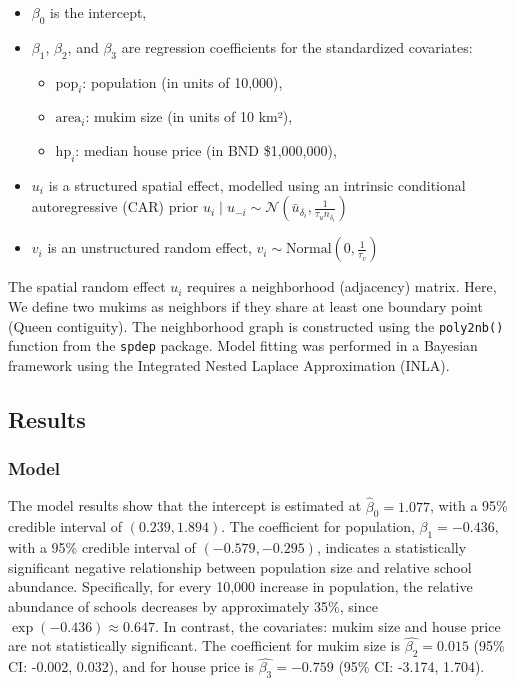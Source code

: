 \documentclass[
  12pt,
]{article}
\providecommand{\tightlist}{%
  \setlength{\itemsep}{0pt}\setlength{\parskip}{0pt}}
\begin{document}
\begin{itemize}
\tightlist
\item
  \(\beta_0\) is the intercept,
\item
  \(\beta_1\), \(\beta_2\), and \(\beta_3\) are regression coefficients
  for the standardized covariates:

  \begin{itemize}
  \tightlist
  \item
    \(\text{pop}_i\): population (in units of 10,000),
  \item
    \(\text{area}_i\): mukim size (in units of 10 km²),
  \item
    \(\text{hp}_i\): median house price (in BND \$1,000,000),
  \end{itemize}
\item
  \(u_i\) is a structured spatial effect, modelled using an intrinsic
  conditional autoregressive (CAR) prior
  \(u_i \mid u_{-i} \sim \mathcal{N}(\bar{u}_{\delta_i}, \frac{1}{\tau_u n_{\delta_i}})\)
\item
  \(v_i\) is an unstructured random effect,
  \(v_i \sim \text{Normal}(0, \frac{1}{\tau_v})\)
\end{itemize}

The spatial random effect \(u_i\) requires a neighborhood (adjacency)
matrix. Here, We define two mukims as neighbors if they share at least
one boundary point (Queen contiguity). The neighborhood graph is
constructed using the \texttt{poly2nb()} function from the
\texttt{spdep} package. Model fitting was performed in a Bayesian
framework using the Integrated Nested Laplace Approximation (INLA).

\subsection{Results}\label{sec-results}

\subsubsection{Model}\label{model}

The model results show that the intercept is estimated at
\(\hat{\beta}_0 = 1.077\), with a 95\% credible interval of
\((0.239, 1.894)\). The coefficient for population,
\(\beta_1 = -0.436\), with a 95\% credible interval of
\((-0.579, -0.295)\), indicates a statistically significant negative
relationship between population size and relative school abundance.
Specifically, for every 10,000 increase in population, the relative
abundance of schools decreases by approximately 35\%, since
\(\exp(-0.436) \approx 0.647\). In contrast, the covariates: mukim size
and house price are not statistically significant. The coefficient for
mukim size is \(\hat{\beta_2}=0.015\) (95\% CI: -0.002, 0.032), and for
house price is \(\hat{\beta_3}=-0.759\) (95\% CI: -3.174, 1.704).
\end{document}
